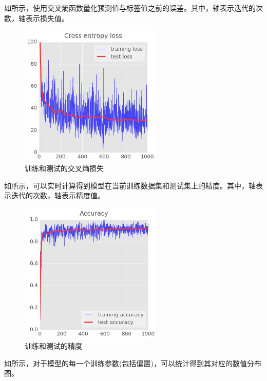 \begin{content}
如所示，使用交叉熵函数量化预测值与标签值之前的误差。其中，轴表示迭代的次数，轴表示损失值。

\begin{figure}[H]
\centering
\includegraphics[width=0.6\textwidth]{figures/mnist-cross-entropy-loss-fig.jpeg}
\caption{训练和测试的交叉熵损失}
 \label{fig:mnist-cross-entropy-loss-fig}
\end{figure}

如所示，可以实时计算得到模型在当前训练数据集和测试集上的精度。其中，轴表示迭代的次数，轴表示精度值。

\begin{figure}[H]
\centering
\includegraphics[width=0.6\textwidth]{figures/mnist-accuracy-fig.jpeg}
\caption{训练和测试的精度}
 \label{fig:mnist-accuracy-fig}
\end{figure}

如所示，对于模型的每一个训练参数(包括偏置)，可以统计得到其对应的数值分布图。


\end{content}
